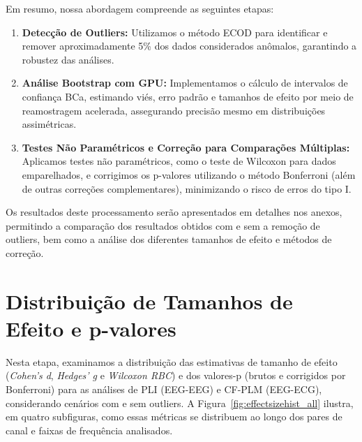 Em resumo, nossa abordagem compreende as seguintes etapas:
\begin{enumerate}
    \item \textbf{Detecção de Outliers:} Utilizamos o método ECOD para identificar e remover aproximadamente 5\% dos dados considerados anômalos, garantindo a robustez das análises.
    \item \textbf{Análise Bootstrap com GPU:} Implementamos o cálculo de intervalos de confiança BCa, estimando viés, erro padrão e tamanhos de efeito por meio de reamostragem acelerada, assegurando precisão mesmo em distribuições assimétricas.
    \item \textbf{Testes Não Paramétricos e Correção para Comparações Múltiplas:} Aplicamos testes não paramétricos, como o teste de Wilcoxon para dados emparelhados, e corrigimos os p-valores utilizando o método Bonferroni (além de outras correções complementares), minimizando o risco de erros do tipo I.
\end{enumerate}

Os resultados deste processamento serão apresentados em detalhes nos anexos, permitindo a comparação dos resultados obtidos com e sem a remoção de outliers, bem como a análise dos diferentes tamanhos de efeito e métodos de correção.

\section{Distribuição de Tamanhos de Efeito e p-valores}
\label{sec:effect_size_distribution}

Nesta etapa, examinamos a distribuição das estimativas de tamanho de efeito (\emph{Cohen's d}, \emph{Hedges' g} e \emph{Wilcoxon RBC}) e dos valores-p (brutos e corrigidos por Bonferroni) para as análises de PLI (EEG-EEG) e CF-PLM (EEG-ECG), considerando cenários com e sem outliers. A Figura~\ref{fig:effectsizehist_all} ilustra, em quatro subfiguras, como essas métricas se distribuem ao longo dos pares de canal e faixas de frequência analisados.

